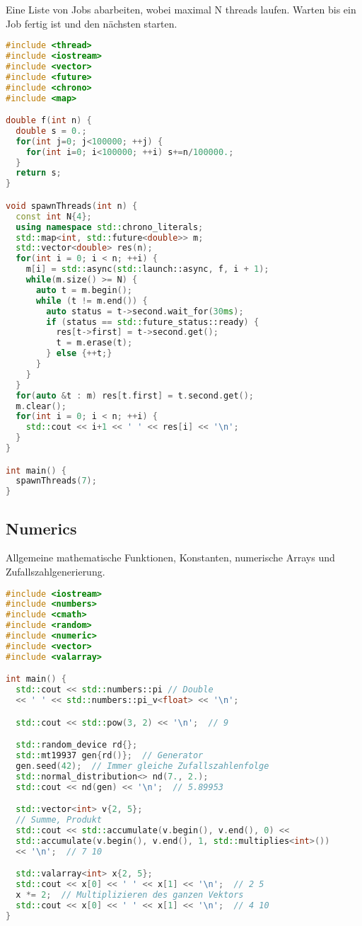 Eine Liste von Jobs abarbeiten, wobei maximal N threads laufen. Warten bis ein
Job fertig ist und den nächsten starten.

\begin{lstlisting}[language=C++]
#include <thread>
#include <iostream>
#include <vector>
#include <future>
#include <chrono>
#include <map>

double f(int n) {
  double s = 0.;
  for(int j=0; j<100000; ++j) {
    for(int i=0; i<100000; ++i) s+=n/100000.;
  }
  return s;
}

void spawnThreads(int n) {
  const int N{4};
  using namespace std::chrono_literals;
  std::map<int, std::future<double>> m;
  std::vector<double> res(n);
  for(int i = 0; i < n; ++i) {
    m[i] = std::async(std::launch::async, f, i + 1);
    while(m.size() >= N) {
      auto t = m.begin();
      while (t != m.end()) {
        auto status = t->second.wait_for(30ms);
        if (status == std::future_status::ready) {
          res[t->first] = t->second.get();
          t = m.erase(t);
        } else {++t;}
      }
    }
  }
  for(auto &t : m) res[t.first] = t.second.get();
  m.clear();
  for(int i = 0; i < n; ++i) {
    std::cout << i+1 << ' ' << res[i] << '\n';
  }
}

int main() {
  spawnThreads(7);
}
\end{lstlisting}

\subsection{Numerics}

Allgemeine mathematische Funktionen, Konstanten, numerische Arrays und
Zufallszahlgenerierung.

\begin{lstlisting}[language=C++]
#include <iostream>
#include <numbers>
#include <cmath>
#include <random>
#include <numeric>
#include <vector>
#include <valarray>

int main() {
  std::cout << std::numbers::pi // Double
  << ' ' << std::numbers::pi_v<float> << '\n';

  std::cout << std::pow(3, 2) << '\n';  // 9

  std::random_device rd{};
  std::mt19937 gen{rd()};  // Generator
  gen.seed(42);  // Immer gleiche Zufallszahlenfolge
  std::normal_distribution<> nd(7., 2.);
  std::cout << nd(gen) << '\n';  // 5.89953

  std::vector<int> v{2, 5};
  // Summe, Produkt
  std::cout << std::accumulate(v.begin(), v.end(), 0) <<
  std::accumulate(v.begin(), v.end(), 1, std::multiplies<int>())
  << '\n';  // 7 10

  std::valarray<int> x{2, 5};
  std::cout << x[0] << ' ' << x[1] << '\n';  // 2 5
  x *= 2;  // Multiplizieren des ganzen Vektors
  std::cout << x[0] << ' ' << x[1] << '\n';  // 4 10
}
\end{lstlisting}

